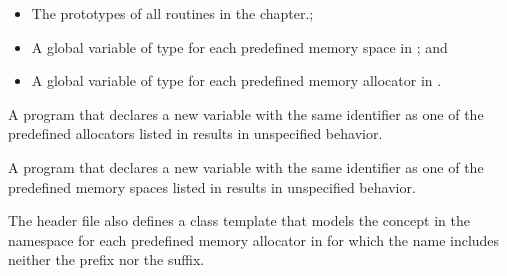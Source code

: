\begin{ccppspecific}
\begin{itemize}
\item The prototypes of all routines in the chapter.;
\item A global variable of type  for each 
      predefined memory space in ; and
\item A global variable of type  for each 
      predefined memory allocator in .
\end{itemize}

A program that declares a new variable with the same identifier as one of 
the predefined allocators listed in  
results in unspecified behavior.

A program that declares a new variable with the same identifier as one of 
the predefined memory spaces listed in  
results in unspecified behavior.
\end{ccppspecific}

\begin{cppspecific}
The  header file also defines a class template that
models the  concept in the 
namespace for each predefined memory allocator in
 for which the name includes
neither the  prefix nor the  suffix.
\end{cppspecific}

